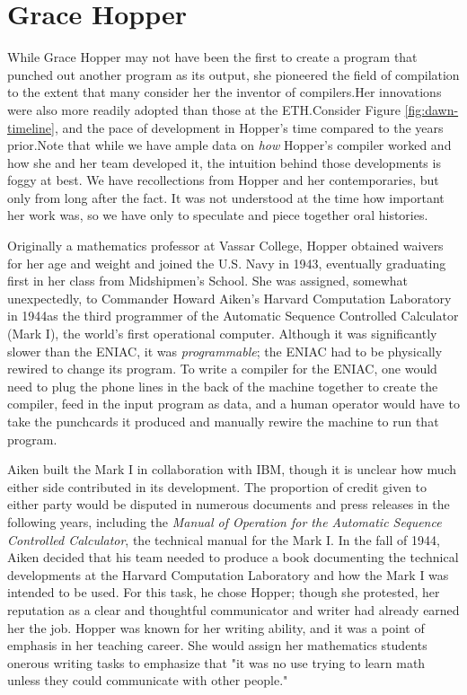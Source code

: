 \section{Grace Hopper}

While Grace Hopper may not have been the first
to create a program that punched
out another program as its output, she pioneered the field of compilation to the
extent that many consider her the inventor of compilers.Her innovations were
also more readily adopted than those at the ETH.Consider Figure
\ref{fig:dawn-timeline}, and the pace of development in Hopper's time compared
to the years prior.Note that while we have ample data on \textit{how} Hopper's
compiler worked and how she and her team developed it, the intuition behind
those developments is foggy at best. We have recollections from Hopper and her
contemporaries, but only from long after the fact. It was not understood at the
time how important her work was, so we have only to speculate and piece together
oral histories.

Originally a mathematics professor at Vassar College, Hopper
obtained waivers for her age and weight and joined the U.S. Navy in 1943,
eventually graduating first in her class from Midshipmen's School. She was
assigned, somewhat unexpectedly, to Commander Howard Aiken's Harvard
Computation Laboratory in 1944as the third programmer of the Automatic Sequence
Controlled Calculator (Mark I), the world's first operational computer. Although
it was significantly slower than the ENIAC, it was \textit{programmable}; the
ENIAC had to be physically rewired to change its program. To write a compiler
for the ENIAC, one would need to plug the phone lines in the back of the
machine together to create the compiler, feed in the input program as data, and
a human operator would have to take the punchcards it produced and manually
rewire the machine to run that program.

Aiken built the Mark I in collaboration
with IBM, though it is unclear how much either side contributed in its
development. The proportion of credit given to either party would be disputed in
numerous documents and press releases in the following years, including
the \textit{Manual of Operation for the Automatic Sequence Controlled
	Calculator}, the technical manual for the Mark I. In the fall of 1944, Aiken
decided that his team needed to produce a book documenting the
technical developments at the Harvard Computation Laboratory and how the Mark I
was intended to be used. For this task, he chose Hopper; though she protested,
her reputation as a clear and thoughtful communicator and writer had already
earned her the job. Hopper was known for her writing ability, and it was a point
of emphasis in her teaching career. She would assign her mathematics students
onerous writing tasks to emphasize that "it was no use trying to learn math
unless they could communicate with other people."
\cite[interview on 5 July, 1972]{grace_hopper_and_the_invention_of_the_information_age_2009}

